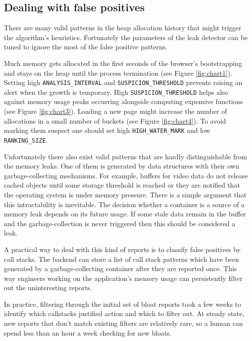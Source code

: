 \documentclass[preprint, numbers]{sigplanconf}
\begin{document}
\subsection{Dealing with false positives}
\label{sec:false}

There are many valid patterns in the heap allocation history that might trigger the algorithm's
heuristics.
Fortunately the parameters of the leak detector can be tuned to ignore the most of
the false positive patterns.

Much memory gets allocated in the first seconds of the browser's bootstrapping
and stays on the heap until the process termination (see Figure \ref{fig:chart1}).
Setting high \texttt{ANALYSIS\_INTERVAL} and \texttt{SUSPICION\_THRESHOLD}
prevents raising an alert when the growth is temporary.
High \texttt{SUSPICION\_THRESHOLD} helps also against memory usage peaks
occurring alongside computing expensive functions (see Figure \ref{fig:chart3}).
Loading a new page might increase the number of allocations in a small
number of buckets (see Figure \ref{fig:chart4}).
To avoid marking them suspect one should set high \texttt{HIGH\_WATER\_MARK}
and low \texttt{RANKING\_SIZE}.

Unfortunately there also exist valid patterns that are hardly distinguishable from
the memory leaks.
One of them is generated by data structures with their own garbage-collecting mechanisms.
For example, buffers for video data do not release cached objects until some storage threshold
is reached or they are notified that the operating system is under memory pressure.
There is a simple argument that this intractability is inevitable.
The decision whether a container is a source of a memory leak
depends on its future usage.
If some stale data remain in the buffer and the garbage-collection is never triggered
then this should be considered a leak.

A practical way to deal with this kind of reports is to
classify false positives by call stacks.
The backend can store a list of call stack patterns
which have been generated by a garbage-collecting container
after they are reported once.
This way engineers working on the application's memory usage
can persistently filter out the uninteresting reports.

In practice, filtering through the initial set of bloat reports took a
few weeks to identify which callstacks justified action and which to
filter out.  At steady state, new reports that don't match existing
filters are relatively rare, so a human can spend less than an hour a
week checking for new bloats.
\end{document}
